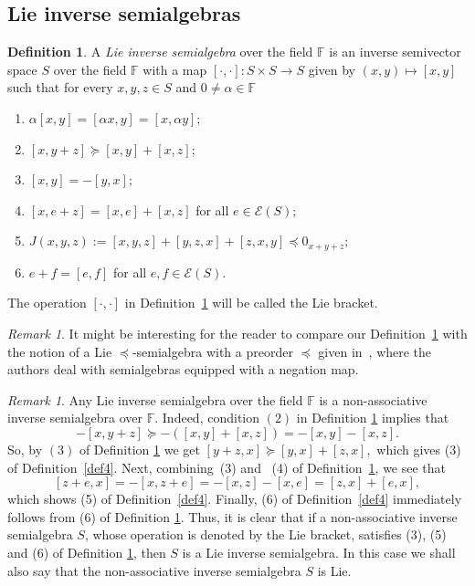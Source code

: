 \documentclass[10pt,a4paper]{amsart}
\theoremstyle{definition}
\newtheorem{defn}[thm]{Definition}
\theoremstyle{remark}
\newtheorem{rem}[thm]{Remark}
\numberwithin{equation}{section}
\newtheorem*{Theorem A}{\textbf{Theorem A}}
\newtheorem*{Corollary E}{\textbf{Corollary E}}
\newtheorem*{Corollary F}{\textbf{Corollary F}}
\newtheorem*{Theorem B}{\textbf{Theorem B}}
\newtheorem*{Theorem C}{\textbf{Theorem C}}
\newtheorem*{Theorem D}{\textbf{Theorem B}}
\newtheorem*{p a}{\textbf{Proof of  Theorem A}}
\newtheorem*{p b}{\textbf{Proof of Theorem B}}
\newtheorem*{p c}{\textbf{Proof of  Theorem C}}
\newtheorem*{p d}{\textbf{Proof of  Theorem D}}
\newcommand{\E}{\mathcal{E}}
\newcommand{\F}{\mathbb{F}}
\newcommand{\0}{{\vartheta}}
\begin{document}
\subsection{Lie inverse semialgebras}\label{subsec:LieInv}
\begin{defn}\label{def6}
   A {\em Lie  inverse semialgebra} over the field $\mathbb{F}$ is an inverse semivector space  $S$ over the field $\mathbb{F}$ with a map  
	$[\cdot,\cdot]:S \times S \rightarrow S$ given by $(x,y)\mapsto [x, y]$  such that for every $x,y,z\in S$ and  $0\neq \alpha\in \F$
   \begin{enumerate}
     
     \item $ \alpha [x,y]= [\alpha x,y]= [x,\alpha y];$
     \item $[x,y+z]\succeq [x,y]+[x,z];$
     \item $[x,y]=-[y,x];$
     \item  $[x,e+z]= [x,e]+[x,z]$ for all $e\in \E(S);$
     \item $J(x,y,z):=[x,y,z]+[y,z,x]+[z,x,y]\preceq 0_{x+y+z};$
     \item $e+f=[e,f] $ for all $e,f\in \E(S).$
   \end{enumerate}
\end{defn}
 The operation $[\cdot,\cdot]$ in Definition~\ref{def6} will be called the Lie bracket.

 \begin{rem}  It might be interesting for the reader to compare our Definition~\ref{def6} with the notion of a Lie $\preceq$-semialgebra with a preorder $\preceq$ given  in~\cite[Definition 3.4]{Chapman}, where the authors deal with semialgebras equipped with a negation map.
\end{rem}


\begin{rem}\label{rem:LieInverseOk} Any Lie  inverse semialgebra over the field $\mathbb{F}$ is a non-associative inverse semialgebra over $\mathbb{F}.$ Indeed,    condition $(2)$ in  Definition \ref{def6} implies that $$-[x,y+z]\succeq -( [x,y]+[x,z])=- [x,y]-[x,z].$$ So, by $(3)$ of Definition \ref{def6}  we get $[y+z,x]\succeq [y,x]+[z,x],$ which gives (3) of Definition~\ref{def4}. Next,  combining~(3) and ~(4) of Definition~\ref{def6},  we see that $$[z+e,x]=-[x,z+e]=-[x,z]-[x,e]=[z,x]+[e,x],$$
which shows (5) of Definition~\ref{def4}. Finally, (6)
of Definition~\ref{def4} immediately follows from
(6) of Definition \ref{def6}. Thus, it is clear that if a 
 non-associative inverse semialgebra $S$, whose operation is denoted by the Lie bracket, satisfies  (3), (5) and (6)
 of Definition \ref{def6}, then $S$ is a Lie  inverse semialgebra. In this case we shall also say that   the non-associative inverse semialgebra $S$ is Lie.
\end{rem}
\end{document}

